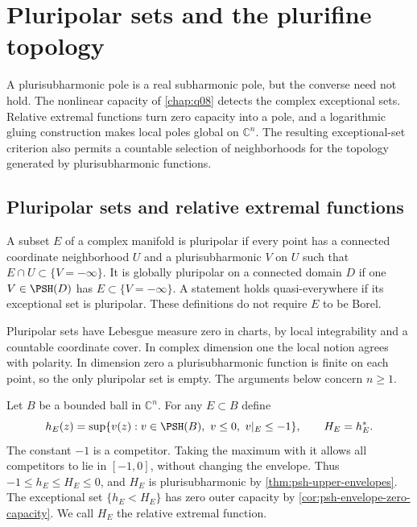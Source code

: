 \chapter{Pluripolar sets and the plurifine topology}
\label{chap:q03}

A plurisubharmonic pole is a real subharmonic pole, but the converse need not hold. The nonlinear capacity of \cref{chap:q08} detects the complex exceptional sets. Relative extremal functions turn zero capacity into a pole, and a logarithmic gluing construction makes local poles global on $\mathbb C^n$. The resulting exceptional-set criterion also permits a countable selection of neighborhoods for the topology generated by plurisubharmonic functions.

\section{Pluripolar sets and relative extremal functions}
\label{sec:pluripolar-extremals}

\begin{definition}\label{def:pluripolar-set}
A subset $E$ of a complex manifold is pluripolar if every point has a connected coordinate neighborhood $U$ and a plurisubharmonic $V$ on $U$ such that $E\cap U\subset\{V=-\infty\}$. It is globally pluripolar on a connected domain $D$ if one $V\in\PSH(D)$ has $E\subset\{V=-\infty\}$. A statement holds quasi-everywhere if its exceptional set is pluripolar. These definitions do not require $E$ to be Borel.
\end{definition}

Pluripolar sets have Lebesgue measure zero in charts, by local integrability and a countable coordinate cover. In complex dimension one the local notion agrees with polarity. In dimension zero a plurisubharmonic function is finite on each point, so the only pluripolar set is empty. The arguments below concern $n\ge1$.

Let $B$ be a bounded ball in $\mathbb C^n$. For any $E\subset B$ define
\[
 h_E(z)=\sup\{v(z):v\in\PSH(B),\ v\le0,\ v|_E\le-1\},
 \qquad H_E=h_E^*.
\]
The constant $-1$ is a competitor. Taking the maximum with it allows all competitors to lie in $[-1,0]$, without changing the envelope. Thus $-1\le h_E\le H_E\le0$, and $H_E$ is plurisubharmonic by \cref{thm:psh-upper-envelopes}. The exceptional set $\{h_E<H_E\}$ has zero outer capacity by \cref{cor:psh-envelope-zero-capacity}. We call $H_E$ the relative extremal function.

